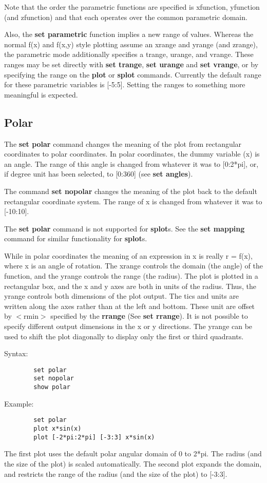 Note that the order the parametric functions are specified is
xfunction, yfunction (and zfunction) and that each operates over the
common parametric domain.

Also, the {\bf set parametric} function implies a new range of values.
Whereas the normal f(x) and f(x,y) style plotting assume an xrange
and yrange (and zrange), the parametric mode additionally specifies a
trange, urange, and vrange. These ranges may be set
directly with {\bf set trange}, {\bf set urange} and {\bf set vrange}, or by
specifying the range on the {\bf plot} or {\bf splot} commands. Currently
the default range for these parametric variables is [-5:5].
Setting the ranges to something more meaningful is expected.
\subsection{Polar}
The {\bf set polar} command changes the meaning of the plot from
rectangular coordinates to polar coordinates. In polar coordinates,
the dummy variable (x) is an angle. The range of this angle is changed
from whatever it was to [0:2*pi], or, if degree unit has been selected,
to [0:360] (see {\bf set angles}).

The command {\bf set nopolar} changes the meaning of the plot back to the
default rectangular coordinate system. The range of x is changed from
whatever it was to [-10:10].

The {\bf set polar} command is not supported for {\bf splot}s.  See the
{\bf set mapping} command for similar functionality for {\bf splot}s.

While in polar coordinates the meaning of an expression in x is really
r = f(x), where x is an angle of rotation. The xrange controls the
domain (the angle) of the function, and the yrange controls the range
(the radius). The plot is plotted in a rectangular box, and the x and
y axes are both in units of the radius. Thus, the yrange controls both
dimensions of the plot output. The tics and units are written along
the axes rather than at the left and bottom. These unit are offset by
$<$rmin$>$ specified by the {\bf rrange} (See {\bf set rrange}). It is not
possible to specify different output dimensions in the x or y
directions. The yrange can be used to shift the plot diagonally to
display only the first or third quadrants.

Syntax:
\begin{verbatim}
        set polar
        set nopolar
        show polar
\end{verbatim}
Example:
\begin{verbatim}
        set polar
        plot x*sin(x)
        plot [-2*pi:2*pi] [-3:3] x*sin(x)
\end{verbatim}
The first plot uses the default polar angular domain of 0 to 2*pi.
The radius (and the size of the plot) is scaled automatically. The
second plot expands the domain, and restricts the range of the radius
(and the size of the plot) to [-3:3].
